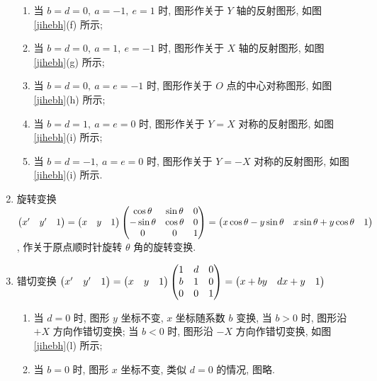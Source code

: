 \begin{theorem}[二维图形的几何变换]
\begin{enumerate}[label=(\arabic{*})]
        \begin{enumerate}
            \item 当 $b=d=0,~a=-1,~e=1$ 时, 图形作关于 $Y$ 轴的反射图形, 如图 \ref{jihebh}(f) 所示;
            \item 当 $b=d=0,~a=1,~e=-1$ 时, 图形作关于 $X$ 轴的反射图形, 如图 \ref{jihebh}(g) 所示;
            \item 当 $b=d=0,~a=e=-1$ 时, 图形作关于 $O$ 点的中心对称图形, 如图 \ref{jihebh}(h) 所示;
            \item 当 $b=d=1,~a=e=0$ 时, 图形作关于 $Y=X$ 对称的反射图形, 如图 \ref{jihebh}(i) 所示;
            \item 当 $b=d=-1,~a=e=0$ 时, 图形作关于 $Y=-X$ 对称的反射图形, 如图 \ref{jihebh}(i) 所示.
        \end{enumerate}
        \item 旋转变换 $\mqty(x'&y'&1)=\mqty(x&y&1)\begin{pmatrix} \cos\theta & \sin\theta & 0 \\ -\sin\theta & \cos\theta & 0 \\ 0 & 0 & 1 \\\end{pmatrix}=\mqty(x\cos\theta-y\sin\theta&x\sin\theta+y\cos\theta&1)$, 作关于原点顺时针旋转 $\theta$ 角的旋转变换.
        \item 错切变换 $\mqty(x'&y'&1)=\mqty(x&y&1)\begin{pmatrix} 1 & d & 0 \\ b & 1 & 0 \\ 0 & 0 & 1 \\\end{pmatrix}=\mqty(x+by&dx+y&1)$ 
        \begin{enumerate}
            \item 当 $d=0$ 时, 图形 $y$ 坐标不变, $x$ 坐标随系数 $b$ 变换, 当 $b>0$ 时, 图形沿 $+X$ 方向作错切变换; 当 $b<0$ 时, 图形沿 $-X$ 方向作错切变换, 如图 \ref{jihebh}(l) 所示;
            \item 当 $b=0$ 时, 图形 $x$ 坐标不变, 类似 $d=0$ 的情况, 图略.
        \end{enumerate}
    \end{enumerate}
\end{theorem}

